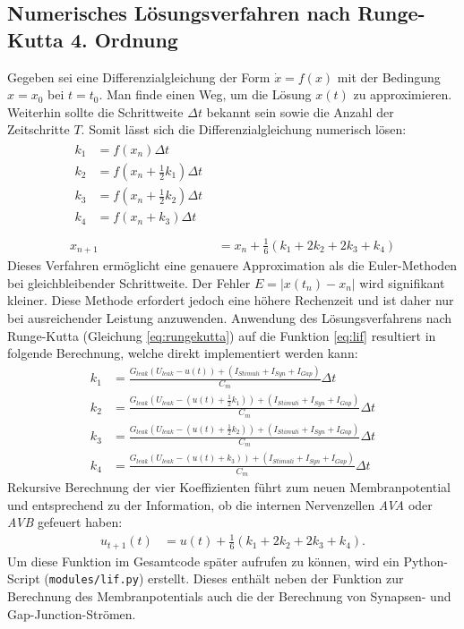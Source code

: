 	\subsection{Numerisches Lösungsverfahren nach Runge-Kutta 4. Ordnung}
		Gegeben sei eine Differenzialgleichung der Form $\dot{x} = f(x)$ mit der Bedingung $x = x_0$ bei $t = t_0$. Man finde einen Weg, um die Lösung $x(t)$ zu approximieren.\\
		Weiterhin sollte die Schrittweite $\Delta t$ bekannt sein sowie die Anzahl der Zeitschritte $T$. Somit lässt sich die Differenzialgleichung numerisch lösen:
		\begin{align}
			\begin{split}
			\label{eq:rungekutta}
			k_1 &= f(x_n) \Delta t\\
			k_2 &= f(x_n + \tfrac{1}{2} k_1) \Delta t\\
			k_3 &= f(x_n + \tfrac{1}{2} k_2) \Delta t\\
			k_4 &= f(x_n + k_3) \Delta t\\
			\end{split}\\[10pt]
			x_{n+1} &= x_n + \tfrac{1}{6} (k_1 + 2 k_2 + 2 k_3 + k_4)
		\end{align}
		Dieses Verfahren ermöglicht eine genauere Approximation als die Euler-Methoden bei gleichbleibender Schrittweite. Der Fehler $E = |x(t_n)-x_n|$ wird signifikant kleiner. Diese Methode erfordert jedoch eine höhere Rechenzeit und ist daher nur bei ausreichender Leistung anzuwenden.
	Anwendung des Lösungsverfahrens nach Runge-Kutta (Gleichung \eqref{eq:rungekutta}) auf die Funktion \eqref{eq:lif} resultiert in folgende Berechnung, welche direkt implementiert werden kann:
	\begin{equation}
	\begin{split}
		\label{eq:runkgekutta_nn}
		k_1 &= \frac{G_{leak} (U_{leak} - u(t)) + (I_{Stimuli} + I_{Syn} + I_{Gap})}{C_m} \Delta t\\
		k_2 &= \frac{G_{leak} (U_{leak} - (u(t) + \tfrac{1}{2} k_1)) + (I_{Stimuli} + I_{Syn} + I_{Gap})}{C_m} \Delta t\\
		k_3 &= \frac{G_{leak} (U_{leak} - (u(t) + \tfrac{1}{2} k_2)) + (I_{Stimuli} + I_{Syn} + I_{Gap})}{C_m} \Delta t\\
		k_4 &= \frac{G_{leak} (U_{leak} - (u(t) + k_3)) + (I_{Stimuli} + I_{Syn} + I_{Gap})}{C_m} \Delta t
	\end{split}
	\end{equation}
	Rekursive Berechnung der vier Koeffizienten führt zum neuen Membranpotential und entsprechend zu der Information, ob die internen Nervenzellen \textit{AVA} oder \textit{AVB} gefeuert haben:
	\begin{align}
		\label{eq:runkgekutta_erg}
		u_{t+1}(t) &= u(t) + \tfrac{1}{6} (k_1 + 2 k_2 + 2 k_3 + k_4).
	\end{align}
	Um diese Funktion im Gesamtcode später aufrufen zu können, wird ein Python-Script (\texttt{modules/lif.py}) erstellt. Dieses enthält neben der Funktion zur Berechnung des Membranpotentials auch die der Berechnung von Synapsen- und Gap-Junction-Strömen.
	
